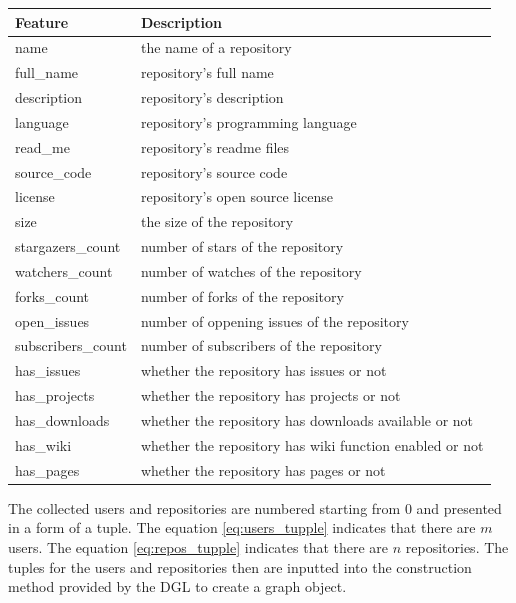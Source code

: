 \documentclass[11pt,twoside]{report}
\begin{document}
\begin{center}
    \begin{tabular}{l | l}
    \hline
    Feature & Description \\
    \hline
    name & the name of a repository \\
    full\_name & repository's full name \\
    description & repository's description \\
    language & repository's programming language \\
    read\_me & repository's readme files \\
    source\_code & repository's source code \\
    license & repository's open source license \\
    size & the size of the repository \\
    stargazers\_count & number of stars of the repository \\
    watchers\_count & number of watches of the repository \\
    forks\_count & number of forks of the repository \\
    open\_issues & number of oppening issues of the repository \\
    subscribers\_count & number of subscribers of the repository \\
    has\_issues & whether the repository has issues or not \\
    has\_projects & whether the repository has projects or not \\
    has\_downloads & whether the repository has downloads available or not \\
    has\_wiki & whether the repository has wiki function enabled or not \\
    has\_pages & whether the repository has pages or not \\
    \end{tabular}
    \label{tab:repo_features}
\end{center}

The collected users and repositories are numbered starting from 0 and presented in a form of a tuple. The equation \ref{eq:users_tupple} indicates that there are $m$ users. The equation \ref{eq:repos_tupple} indicates that there are $n$ repositories. The tuples for the users and repositories then are inputted into the construction method provided by the DGL to create a graph object. 
\end{document}
